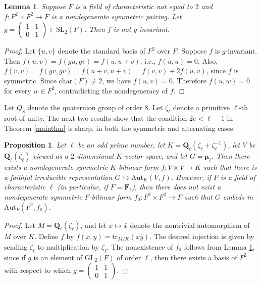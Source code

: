 \documentclass{amsart}
\def\Q{{\mathbf Q}}
\def\F{{\mathbf F}}
\def\f{{\tilde F}}
\def\Aut{\mathrm{Aut}}
\def\fchar{\mathrm{char}}
\def\tr{\mathrm{tr}}
\def\GL{\mathrm{GL}}
\def\SL{\mathrm{SL}}
\def\FF{F}
\def\f{f}
\def\bmu{\boldsymbol \mu}
\newtheorem{lem}[thm]{Lemma}
\newtheorem{prop}[thm]{Proposition}
\theoremstyle{definition}
\begin{document}
\begin{lem}
\label{1101}
Suppose $\FF$ is a field of characteristic not equal to $2$ and
$f:\FF^2 \times \FF^2 \to \FF$
is a nondegenerate symmetric pairing. Let 
$g=\left(\begin{array}{cc}1&1\\0&1\end{array}\right)
\in \SL_2(\FF)$. Then $f$
is not $g$-invariant.
\end{lem}

\begin{proof}
Let $\{u,v\}$ denote the standard basis of $\FF^2$ over $\FF$.
Suppose $f$ is $g$-invariant. Then
$f(u,v)=f(gu,gv)=f(u,u+v)$, i.e.,
$f(u,u)=0$.
Also,
$f(v,v)=f(gv,gv)=f(u+v,u+v)=
f(v,v)+2f(u,v)$,
since $f$ is symmetric.
Since $\fchar(F) \ne 2$, we have 
$f(u,v)=0$.
Therefore $f(u,w)=0$ for every $w\in\FF^2$,
contradicting the nondegeneracy of $f$. 
\end{proof}

Let $Q_8$ denote the quaternion group of order $8$.
Let $\zeta_\ell$ denote a primitive $\ell$-th root of unity.
The next two results show that 
the condition $2e<\ell-1$ in Theorem \ref{mainthm} is sharp,
in both the symmetric and alternating cases.

\begin{prop}
\label{ramcounterex}
Let $\ell$ be an odd prime number, let
$K = \Q_\ell(\zeta_\ell+\zeta_\ell^{-1})$, 
let $V$ be $\Q_\ell(\zeta_\ell)$ viewed as a $2$-dimensional
$K$-vector space, and let $G=\bmu_\ell$.  
Then there exists a nondegenerate symmetric 
$K$-bilinear
form $\f:V \times V \to K$ such that there is a 
faithful irreducible representation  
$G \hookrightarrow \Aut_K(V,{\f})$. However, if
$\FF$ is a field of characteristic $\ell$ (in particular,
if $\FF=\F_\ell$), then
there does not exist a nondegenerate symmetric $\FF$-bilinear
form ${{\f}_0}:\FF^2\times\FF^2\to\FF$
such that $G$ embeds in $\Aut_\FF(\FF^2,{{\f}_0})$.
\end{prop}

\begin{proof}
Let $M=\Q_\ell(\zeta_\ell)$, and let $x \mapsto {\bar x}$ denote
the nontrivial automorphism of $M$ over $K$.
Define $f$ by
$f(x,y)=\tr_{M/K}(x{\bar y})$.
The desired injection is given by sending $\zeta_\ell$ to
multiplication by $\zeta_\ell$.
The nonexistence of ${\f}_0$ follows from Lemma \ref{1101},
since if $g$ is an element of $\GL_2(\FF)$ of order $\ell$, 
then there exists a basis of $\FF^2$ with respect 
to which $g=\left(\begin{array}{cc}1&1\\0&1\end{array}\right)$. 
\end{proof}
\end{document}
